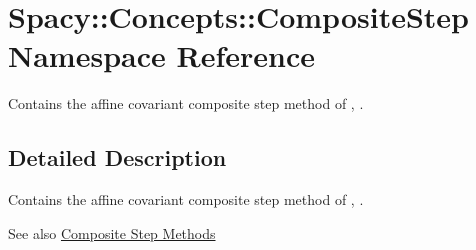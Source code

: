 \hypertarget{namespaceSpacy_1_1Concepts_1_1CompositeStep}{}\section{Spacy\+:\+:Concepts\+:\+:Composite\+Step Namespace Reference}
\label{namespaceSpacy_1_1Concepts_1_1CompositeStep}


Contains the affine covariant composite step method of \cite{Lubkoll2015}, \cite{Lubkoll2015a}.  




\subsection{Detailed Description}
Contains the affine covariant composite step method of \cite{Lubkoll2015}, \cite{Lubkoll2015a}. 

\begin{DoxySeeAlso}{See also}
\hyperlink{group__CSGroup}{Composite Step Methods} 
\end{DoxySeeAlso}
